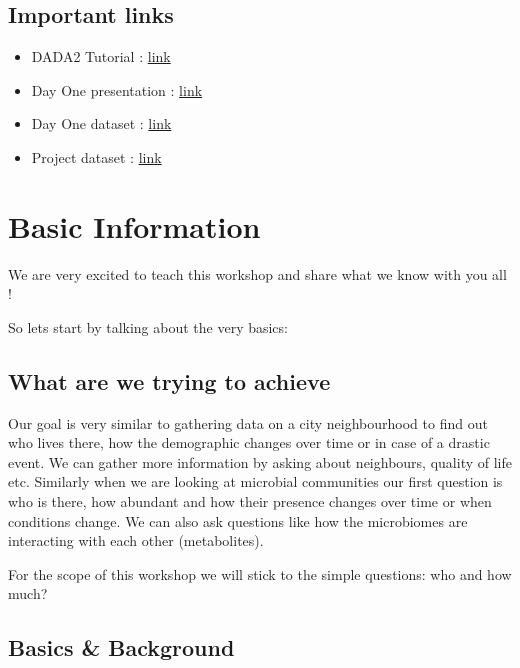 \documentclass[
]{book}
\providecommand{\tightlist}{%
  \setlength{\itemsep}{0pt}\setlength{\parskip}{0pt}}
\begin{document}
\hypertarget{important-links}{%
\section{Important links}\label{important-links}}

\begin{itemize}
\tightlist
\item
  DADA2 Tutorial : \href{http://benjjneb.github.io/dada2/tutorial.html}{link}
\item
  Day One presentation : \href{microbiomeworkshop.pdf}{link}
\item
  Day One dataset : \href{MiSeqSOPData.zip}{link}
\item
  Project dataset : \href{https://www.dropbox.com/sh/qra6ohbsyt1icaz/AAACvlNjUhfkbkGIp_1KA2uCa?dl=0}{link}
\end{itemize}

\hypertarget{basic-information}{%
\chapter{Basic Information}\label{basic-information}}

We are very excited to teach this workshop and share what we know with you all !

So lets start by talking about the very basics:

\hypertarget{what-are-we-trying-to-achieve}{%
\section{What are we trying to achieve}\label{what-are-we-trying-to-achieve}}

Our goal is very similar to gathering data on a city neighbourhood to find out who lives there, how the demographic changes over time or in case of a drastic event. We can gather more information by asking about neighbours, quality of life etc. Similarly when we are looking at microbial communities our first question is who is there, how abundant and how their presence changes over time or when conditions change. We can also ask questions like how the microbiomes are interacting with each other (metabolites).

For the scope of this workshop we will stick to the simple questions: who and how much?

\hypertarget{basics-background}{%
\section{Basics \& Background}\label{basics-background}}
\end{document}
